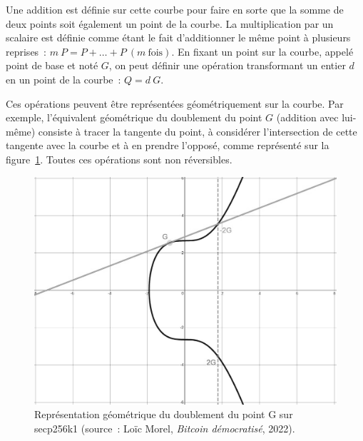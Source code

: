 Une addition est définie sur cette courbe pour faire en sorte que la somme de deux points soit également un point de la courbe. La multiplication par un scalaire est définie comme étant le fait d'additionner le même point à plusieurs reprises~: $m~P = P + \ldots + P~(m~\mathrm{fois})$. En fixant un point sur la courbe, appelé point de base et noté $G$, on peut définir une opération transformant un entier $d$ en un point de la courbe~: $Q = d~G$.

Ces opérations peuvent être représentées géométriquement sur la courbe. Par exemple, l'équivalent géométrique du doublement du point $G$ (addition avec lui-même) consiste à tracer la tangente du point, à considérer l'intersection de cette tangente avec la courbe et à en prendre l'opposé, comme représenté sur la figure~\ref{fig:secp256k1-multiplication}. Toutes ces opérations sont non réversibles.

\begin{figure}[h]
  \centering
  \includegraphics[scale=0.4]{img/secp256k1-multiplication.png}
  \caption{Représentation géométrique du doublement du point G sur secp256k1 (source~: Loïc Morel, \emph{Bitcoin démocratisé}, 2022).}
  \label{fig:secp256k1-multiplication}
\end{figure}

